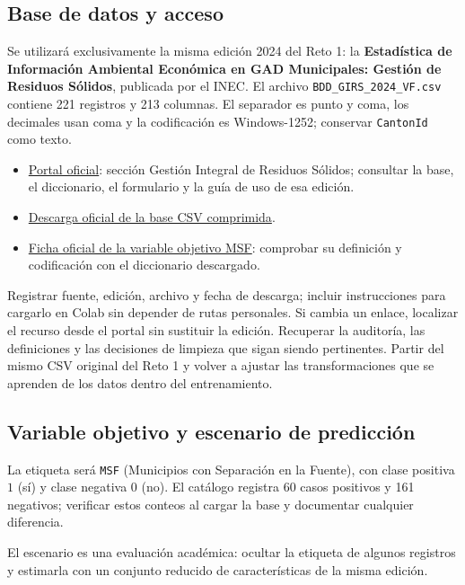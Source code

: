 \documentclass[a4,11pt]{aleph-notas}
\begin{document}
\subsection*{Base de datos y acceso}
Se utilizará exclusivamente la misma edición 2024 del Reto 1: la \textbf{Estadística de Información Ambiental Económica en GAD Municipales: Gestión de Residuos Sólidos}, publicada por el INEC. El archivo \texttt{BDD\_GIRS\_2024\_VF.csv} contiene 221 registros y 213 columnas. El separador es punto y coma, los decimales usan coma y la codificación es Windows-1252; conservar \texttt{CantonId} como texto.
\begin{itemize}[leftmargin=*]
    \item \href{https://www.ecuadorencifras.gob.ec/gad-municipales/}{Portal oficial}: sección Gestión Integral de Residuos Sólidos; consultar la base, el diccionario, el formulario y la guía de uso de esa edición.
    \item \href{https://www.ecuadorencifras.gob.ec/documentos/web-inec/Encuestas_Ambientales/Municipios/2024/grs/2_BDD_DATOS_ABIERTOS_GRS_GADM_2024_12_CSV.zip}{Descarga oficial de la base CSV comprimida}.
    \item \href{https://anda.inec.gob.ec/anda5/index.php/catalog/1294/variable/F18/V2774?name=MSF}{Ficha oficial de la variable objetivo MSF}: comprobar su definición y codificación con el diccionario descargado.
\end{itemize}
Registrar fuente, edición, archivo y fecha de descarga; incluir instrucciones para cargarlo en Colab sin depender de rutas personales. Si cambia un enlace, localizar el recurso desde el portal sin sustituir la edición. Recuperar la auditoría, las definiciones y las decisiones de limpieza que sigan siendo pertinentes. Partir del mismo CSV original del Reto 1 y volver a ajustar las transformaciones que se aprenden de los datos dentro del entrenamiento.

\subsection*{Variable objetivo y escenario de predicción}
La etiqueta será \texttt{MSF} (Municipios con Separación en la Fuente), con clase positiva $1$ (sí) y clase negativa $0$ (no). El catálogo registra 60 casos positivos y 161 negativos; verificar estos conteos al cargar la base y documentar cualquier diferencia.

El escenario es una evaluación académica: ocultar la etiqueta de algunos registros y estimarla con un conjunto reducido de características de la misma edición. 
\end{document}
